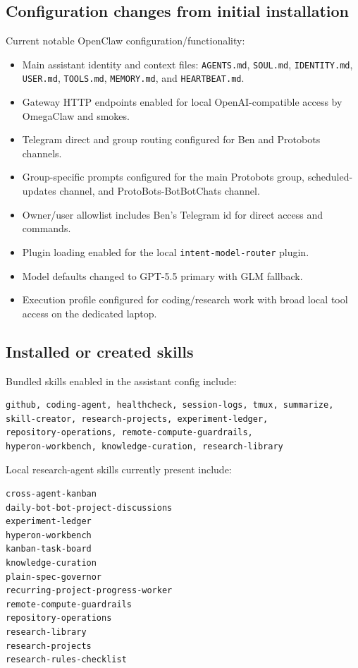 \documentclass[11pt]{article}
\begin{document}
\subsection{Configuration changes from initial installation}

Current notable OpenClaw configuration/functionality:
\begin{itemize}
  \item Main assistant identity and context files: \texttt{AGENTS.md}, \texttt{SOUL.md}, \texttt{IDENTITY.md}, \texttt{USER.md}, \texttt{TOOLS.md}, \texttt{MEMORY.md}, and \texttt{HEARTBEAT.md}.
  \item Gateway HTTP endpoints enabled for local OpenAI-compatible access by OmegaClaw and smokes.
  \item Telegram direct and group routing configured for Ben and Protobots channels.
  \item Group-specific prompts configured for the main Protobots group, scheduled-updates channel, and ProtoBots-BotBotChats channel.
  \item Owner/user allowlist includes Ben's Telegram id for direct access and commands.
  \item Plugin loading enabled for the local \texttt{intent-model-router} plugin.
  \item Model defaults changed to GPT-5.5 primary with GLM fallback.
  \item Execution profile configured for coding/research work with broad local tool access on the dedicated laptop.
\end{itemize}

\subsection{Installed or created skills}

Bundled skills enabled in the assistant config include:
\begin{verbatim}
github, coding-agent, healthcheck, session-logs, tmux, summarize,
skill-creator, research-projects, experiment-ledger,
repository-operations, remote-compute-guardrails,
hyperon-workbench, knowledge-curation, research-library
\end{verbatim}

Local research-agent skills currently present include:
\begin{verbatim}
cross-agent-kanban
daily-bot-bot-project-discussions
experiment-ledger
hyperon-workbench
kanban-task-board
knowledge-curation
plain-spec-governor
recurring-project-progress-worker
remote-compute-guardrails
repository-operations
research-library
research-projects
research-rules-checklist
\end{verbatim}
\end{document}
